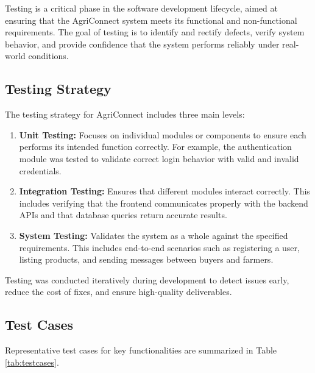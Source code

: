 \documentclass[12pt,a4paper]{article}
\begin{document}
Testing is a critical phase in the software development lifecycle, aimed at ensuring that the AgriConnect system meets its functional and non-functional requirements. The goal of testing is to identify and rectify defects, verify system behavior, and provide confidence that the system performs reliably under real-world conditions.

\subsection{Testing Strategy}

The testing strategy for AgriConnect includes three main levels:

\begin{enumerate}
    \item \textbf{Unit Testing:} Focuses on individual modules or components to ensure each performs its intended function correctly. For example, the authentication module was tested to validate correct login behavior with valid and invalid credentials.
    \item \textbf{Integration Testing:} Ensures that different modules interact correctly. This includes verifying that the frontend communicates properly with the backend APIs and that database queries return accurate results.
    \item \textbf{System Testing:} Validates the system as a whole against the specified requirements. This includes end-to-end scenarios such as registering a user, listing products, and sending messages between buyers and farmers.
\end{enumerate}

Testing was conducted iteratively during development to detect issues early, reduce the cost of fixes, and ensure high-quality deliverables.

\subsection{Test Cases}

Representative test cases for key functionalities are summarized in Table \ref{tab:testcases}.
\end{document}
